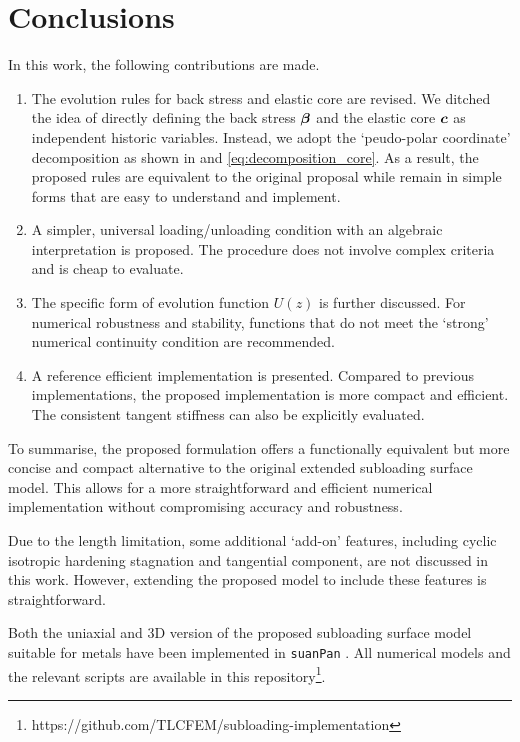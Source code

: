 \section{Conclusions}
In this work, the following contributions are made.
\begin{enumerate}
    \item The evolution rules for back stress and elastic core are revised.
    We ditched the idea of directly defining the back stress $\bm{\beta}$ and the elastic core $\bm{c}$ as independent historic variables.
    Instead, we adopt the `peudo-polar coordinate' decomposition as shown in  and \eqref{eq:decomposition_core}.
    As a result, the proposed rules are equivalent to the original proposal while remain in simple forms that are easy to understand and implement.
    \item A simpler, universal loading/unloading condition with an algebraic interpretation is proposed.
    The procedure does not involve complex criteria and is cheap to evaluate.
    \item The specific form of evolution function $U\left(z\right)$ is further discussed.
          For numerical robustness and stability, functions that do not meet the `strong' numerical continuity condition are recommended.
    \item A reference efficient implementation is presented.
    Compared to previous implementations, the proposed implementation is more compact and efficient.
    The consistent tangent stiffness can also be explicitly evaluated.
\end{enumerate}
To summarise, the proposed formulation offers a functionally equivalent but more concise and compact alternative to the original extended subloading surface model.
This allows for a more straightforward and efficient numerical implementation without compromising accuracy and robustness.

Due to the length limitation, some additional `add-on' features, including cyclic isotropic hardening stagnation and tangential component, are not discussed in this work.
However, extending the proposed model to include these features is straightforward.

Both the uniaxial and 3D version of the proposed subloading surface model suitable for metals have been implemented in \texttt{suanPan} \citep{Chang2024}.
All numerical models and the relevant scripts are available in this repository\footnote{https://github.com/TLCFEM/subloading-implementation}.